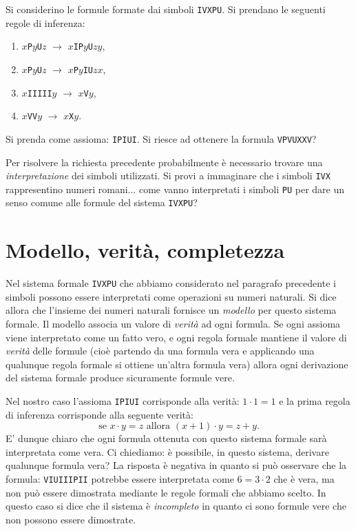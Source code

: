 \documentclass[italian,a4paper,hidelinks]{scrartcl}
\newcommand{\myemph}[1]{\emph{#1}\marginpar{#1}}
\begin{document}
\begin{example}
Si  considerino le formule formate dai simboli
\texttt{IVXPU}.
Si prendano le seguenti regole di inferenza:
  \begin{enumerate}
  \item $x$\texttt{P}$y$\texttt{U}$z$ $\to$ $x$\texttt{IP}$y$\texttt{U}$zy$,
  \item $x$\texttt{P}$y$\texttt{U}$z$ $\to$ $x$\texttt{P}$y$\texttt{IU}$zx$,
  \item $x$\texttt{IIIII}$y$ $\to$ $x$\texttt{V}$y$,
  \item $x$\texttt{VV}$y$ $\to$ $x$\texttt{X}$y$.
  \end{enumerate}
  Si prenda come assioma: \texttt{IPIUI}. Si riesce ad ottenere la formula \texttt{VPVUXXV}?
\end{example}

Per risolvere la richiesta precedente probabilmente è
necessario trovare una \emph{interpretazione} dei simboli
utilizzati. Si provi a immaginare che i simboli \texttt{IVX}
rappresentino numeri romani... come vanno interpretati i simboli
\texttt{PU} per dare un senso comune alle formule del sistema
\texttt{IVXPU}?

\section{Modello, verità, completezza}

Nel sistema formale \texttt{IVXPU}
che abbiamo considerato nel paragrafo precedente i simboli possono essere interpretati
come operazioni su numeri naturali. Si dice allora che l'insieme dei
numeri naturali fornisce un \myemph{modello} per questo sistema
formale. Il modello associa un valore di \myemph{verità} ad ogni formula.
Se ogni assioma viene interpretato come un fatto vero, e ogni regola
formale mantiene il valore di \emph{verità} delle formule (cioè
partendo da una formula vera e applicando una qualunque regola formale
si ottiene un'altra formula vera) allora ogni derivazione del sistema
formale produce sicuramente formule vere.

Nel nostro caso l'assioma \texttt{IPIUI} corrisponde alla verità:
$1\cdot 1 = 1$ e
la prima regola di inferenza corrisponde alla seguente verità:
\[
\text{se $x\cdot y = z$ allora $(x+1)\cdot y = z + y$.}
\]
E' dunque chiaro che ogni formula ottenuta con questo sistema formale
sarà interpretata come vera. Ci chiediamo: è possibile, in questo
sistema, derivare qualunque formula vera? La risposta è negativa
in quanto si può osservare che la formula: \texttt{VIUIIIPII} potrebbe
essere interpretata come $6 = 3\cdot 2$ che è vera, ma non può essere
dimostrata mediante le regole formali che abbiamo scelto.
In questo caso si dice che il sistema è \myemph{incompleto} in quanto ci sono
formule vere che non possono essere dimostrate.
\end{document}
